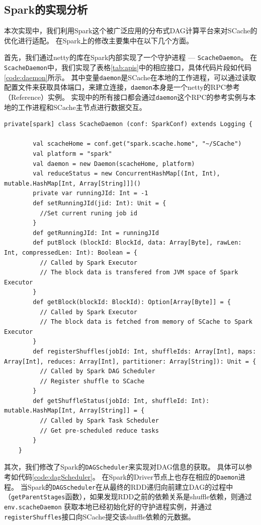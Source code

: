 \subsection{Spark的实现分析}
本次实现中，我们利用Spark这个被广泛应用的分布式DAG计算平台来对SCache的优化进行适配。
在Spark上的修改主要集中在以下几个方面。

首先，我们通过netty\cite{netty}的库在Spark内部实现了一个守护进程 --- \verb|ScacheDaemon|。
在\verb|ScacheDaemon|中，我们实现了表格\ref{tab:apis}中的相应接口，具体代码片段如代码\ref{code:daemon}所示。
其中变量\verb|daemon|是SCache在本地的工作进程，可以通过读取配置文件来获取具体端口，来建立连接，\verb|daemon|本身是一个netty的RPC参考（Reference）实例。
实现中的所有接口都会通过\verb|daemon|这个RPC的参考实例与本地的工作进程和SCache主节点进行数据交互。

\begin{lstlisting}[style={myScalastyle}, caption={ScacheDaemon代码片段}, label={code:daemon}]
    private[spark] class ScacheDaemon (conf: SparkConf) extends Logging {

        val scacheHome = conf.get("spark.scache.home", "~/SCache")
        val platform = "spark"  
        val daemon = new Daemon(scacheHome, platform)   
        val reduceStatus = new ConcurrentHashMap[(Int, Int), mutable.HashMap[Int, Array[String]]]() 
        private var runningJId: Int = -1    
        def setRunningJId(jid: Int): Unit = {
          //Set current runing job id
        }   
        def getRunningJId: Int = runningJId 
        def putBlock (blockId: BlockId, data: Array[Byte], rawLen: Int, compressedLen: Int): Boolean = {
          // Called by Spark Executor
          // The block data is transfered from JVM space of Spark Executor
        }   
        def getBlock(blockId: BlockId): Option[Array[Byte]] = {
          // Called by Spark Executor
          // The block data is fetched from memory of SCache to Spark Executor
        }   
        def registerShuffles(jobId: Int, shuffleIds: Array[Int], maps: Array[Int], reduces: Array[Int], partitioner: Array[String]): Unit = {
          // Called by Spark DAG Scheduler
          // Register shuffle to SCache
        }   
        def getShuffleStatus(jobId: Int, shuffleId: Int): mutable.HashMap[Int, Array[String]] = {
          // Called by Spark Task Scheduler
          // Get pre-scheduled reduce tasks
        }   
    }
\end{lstlisting}

其次，我们修改了Spark的\verb|DAGScheduler|来实现对DAG信息的获取。
具体可以参考如代码\ref{code:dagScheduler}。
在Spark的Driver节点上也存在相应的\verb|Daemon|进程。
当Spark的\verb|DAGScheduler|在从最终的RDD递归向前建立DAG的过程中（\verb|getParentStages|函数），如果发现RDD之前的依赖关系是shuffle依赖，则通过\verb|env.scacheDaemon|
获取本地已经初始化好的守护进程实例，并通过\verb|registerShuffles|接口向SCache提交该shuffle依赖的元数据。

